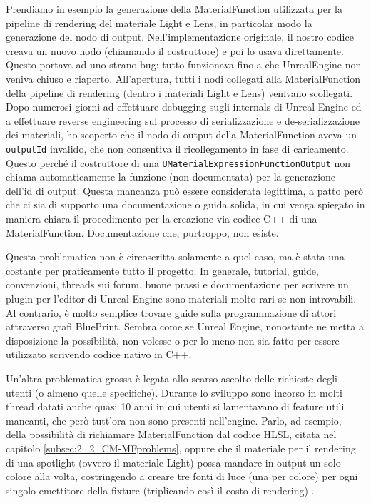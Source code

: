 \documentclass[main.tex]{subfiles}
\begin{document}
Prendiamo in esempio la generazione della MaterialFunction utilizzata per la pipeline di rendering del materiale Light e Lens, in particolar modo la generazione del nodo di output. Nell'implementazione originale, il nostro codice creava un nuovo nodo (chiamando il costruttore) e poi lo usava direttamente. Questo portava ad uno strano bug: tutto funzionava fino a che UnrealEngine non veniva chiuso e riaperto. All'apertura, tutti i nodi collegati alla MaterialFunction della pipeline di rendering (dentro i materiali Light e Lens) venivano scollegati. Dopo numerosi giorni ad effettuare debugging sugli internals di Unreal Engine ed a effettuare reverse engineering sul processo di serializzazione e de-serializzazione dei materiali, ho scoperto che il nodo di output della MaterialFunction aveva un \lstinline{outputId} invalido, che non consentiva il ricollegamento in fase di caricamento. Questo perché il costruttore di una \lstinline{UMaterialExpressionFunctionOutput} non chiama automaticamente la funzione (non documentata) per la generazione dell'id di output. Questa mancanza può essere considerata legittima, a patto però che ci sia di supporto una documentazione o guida solida, in cui venga spiegato in maniera chiara il procedimento per la creazione via codice C++ di una MaterialFunction. Documentazione che, purtroppo, non esiste.

Questa problematica non è circoscritta solamente a quel caso, ma è stata una costante per praticamente tutto il progetto. In generale, tutorial, guide, convenzioni, threads sui forum, buone prassi e documentazione per scrivere un plugin per l'editor di Unreal Engine sono materiali molto rari se non introvabili. Al contrario, è molto semplice trovare guide sulla programmazione di attori attraverso grafi BluePrint. Sembra come se Unreal Engine, nonostante ne metta a disposizione la possibilità, non volesse o per lo meno non sia fatto per essere utilizzato scrivendo codice nativo in C++.
\newline

Un'altra problematica grossa è legata allo scarso ascolto delle richieste degli utenti (o almeno quelle specifiche). Durante lo sviluppo sono incorso in molti thread datati anche quasi 10 anni in cui utenti si lamentavano di feature utili mancanti, che però tutt'ora non sono presenti nell'engine. Parlo, ad esempio, della possibilità di richiamare MaterialFunction dal codice HLSL, citata nel capitolo \ref{subsec:2_2_CM-MFproblems}, oppure che il materiale per il rendering di una spotlight (ovvero il materiale Light) possa mandare in output un solo colore alla volta, costringendo a creare tre fonti di luce (una per colore) per ogni singolo emettitore della fixture (triplicando così il costo di rendering) \cite{rgbSpotlight}.\newline
\end{document}
